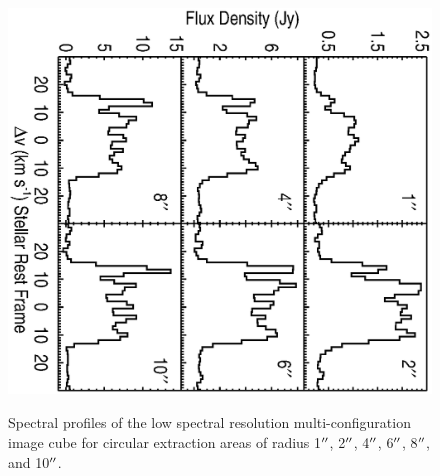 \documentclass[preprint2]{aastex}
\begin{document}
\clearpage

\begin{figure}
\includegraphics[scale=0.75, angle=90, width=13.0cm, height=11cm, trim=30pt 0pt 0pt 50pt]{test.eps}
\caption{Spectral profiles of the low spectral resolution multi-configuration image cube for circular extraction areas of radius 1$\mbox{$^{\prime\prime}$}$, 2$\mbox{$^{\prime\prime}$}$, 4$\mbox{$^{\prime\prime}$}$, 6$\mbox{$^{\prime\prime}$}$, 8$\mbox{$^{\prime\prime}$}$, and 10$\mbox{$^{\prime\prime}$}$.}
\label{fig:fig4}
\end{figure}

\clearpage
\end{document}
